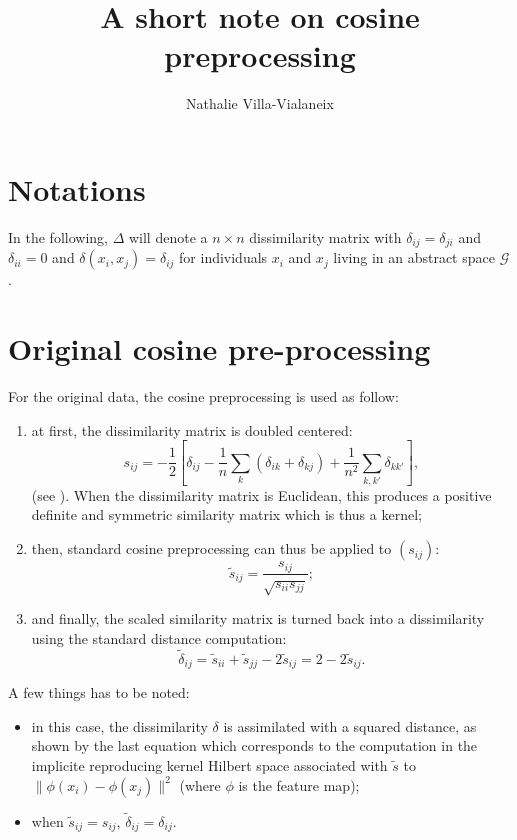 \documentclass[a4paper,10pt]{scrartcl}
\title{A short note on cosine preprocessing}
\author{Nathalie Villa-Vialaneix}
\begin{document}
\sloppy
\maketitle

\section{Notations}

In the following, $\Delta$ will denote a $n\times n$ dissimilarity matrix with
$\delta_{ij}=\delta_{ji}$ and $\delta_{ii}=0$ and $\delta(x_i,x_j)=\delta_{ij}$
for individuals $x_i$ and $x_j$ living in an abstract space $\mathcal{G}$.

\section{Original cosine pre-processing}

For the original data, the cosine preprocessing is used as follow:
\begin{enumerate}
	\item at first, the dissimilarity matrix is doubled centered:
	\[
		s_{ij} = -\frac{1}{2} \left[\delta_{ij} -\frac{1}{n} \sum_k
\left(\delta_{ik}+\delta_{kj}\right) + \frac{1}{n^2} \sum_{k,k'}
\delta_{kk'}\right],
	\]
	(see \cite{lee_verleysen_NDR2007}). When the dissimilarity matrix is
Euclidean, this produces a positive definite and symmetric similarity matrix
which is thus a kernel;
	\item then, standard cosine preprocessing \cite{benhur_weston_DMTLS2010} can
thus be applied to $(s_{ij})$:
	\[
		\tilde{s}_{ij} = \frac{s_{ij}}{\sqrt{s_{ii}s_{jj}}};
	\]
	\item and finally, the scaled similarity matrix is turned back into a
dissimilarity using the standard distance computation:
	\[
		\tilde{\delta}_{ij} = \tilde{s}_{ii} + \tilde{s}_{jj} - 2\tilde{s}_{ij} =
2-2\tilde{s}_{ij}.
	\]
\end{enumerate}

A few things has to be noted:
\begin{itemize}
	\item in this case, the dissimilarity $\delta$ is assimilated with a squared
distance, as shown by the last equation which corresponds to the computation in
the implicite reproducing kernel Hilbert space associated with $\tilde{s}$ to
$\|\phi(x_i)-\phi(x_j)\|^2$ (where $\phi$ is the feature map);
	\item when $\tilde{s}_{ij}=s_{ij}$, $\tilde{\delta}_{ij}=\delta_{ij}$.
\end{itemize}
\end{document}

